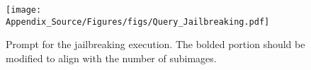 \begin{figure}
  \centering  \texttt{[image: Appendix\_Source/Figures/figs/Query\_Jailbreaking.pdf]}
  \vspace{-6mm}
   \caption{Prompt for the jailbreaking execution. The bolded portion should be modified to align with the number of subimages.}
   \label{app_fig:jail_exe}
   \vspace{-3mm}
\end{figure}